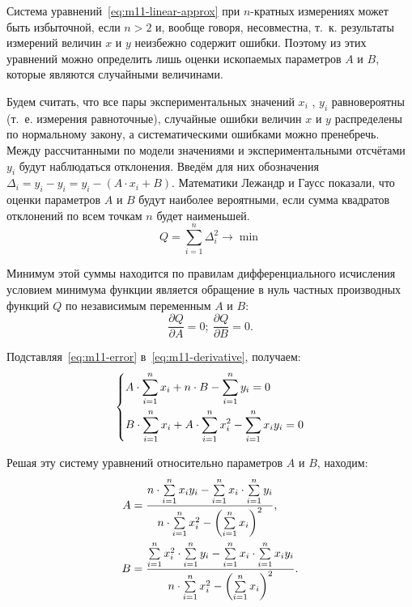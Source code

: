 \documentclass[a4paper, 12pt]{extarticle}
\newcommand{\isum}{\sum\limits_{i=1}^{n}}
\begin{document}
Система уравнений~\eqref{eq:m11-linear-approx} при $n$-кратных измерениях может быть избыточной, если $n >2$ и, вообще говоря, несовместна, т.~к. результаты измерений величин $x$ и $y$ неизбежно содержит ошибки. Поэтому из этих уравнений можно определить лишь оценки ископаемых параметров $A$ и $B$, которые являются случайными величинами. %

Будем считать, что все пары экспериментальных значений $x_i$ , $y_i$  равновероятны (т.~е. измерения равноточные), случайные ошибки величин $x$ и $y$ распределены по нормальному закону, а систематическими ошибками можно пренебречь. Между рассчитанными по модели значениями и экспериментальными отсчётами $y_i$ будут наблюдаться отклонения. Введём для них обозначения $\Delta_i = y_i - y_i = y_i - (A \cdot x_i + B)$. %
Математики Лежандр и Гаусс показали, что оценки параметров $A$ и $B$ будут наиболее вероятными, если сумма квадратов отклонений по всем точкам $n$ будет наименьшей. %
\begin{equation}
\label{eq:m11-error}
Q = \isum \Delta_i^2 \to \min
\end{equation}

Минимум этой суммы находится по правилам дифференциального исчисления условием минимума функции является обращение в нуль частных производных функций $Q$ по независимым переменным $A$ и $B$: 
\begin{equation}
\label{eq:m11-derivative}
\frac{\partial Q}{\partial A} = 0; \ \frac{\partial Q}{\partial B} = 0. %
\end{equation}

Подставляя~\eqref{eq:m11-error} в~\eqref{eq:m11-derivative}, получаем: %
\begin{equation}
\label{eq:m11-system}
\left\{ \aligned
&A \cdot \isum x_i + n \cdot B - \isum y_i = 0 \\ %
&B \cdot \isum x_i + A \cdot \isum x_i^2 - \isum x_i y_i = 0 %
\endaligned \right.
\end{equation}

Решая эту систему уравнений относительно параметров $A$ и $B$, находим: 
\begin{equation}
\label{eq:m11-solution} %
\aligned
A &= \frac{n \cdot \isum x_i y_i - \isum x_i \cdot \isum y_i}{n \cdot \isum x_i^2 - \left( \isum x_i \right)^2}, \\
B &= \frac{\isum x_i^2 \cdot \isum y_i - \isum x_i \cdot \isum x_i y_i}{n \cdot \isum x_i^2 - \left( \isum x_i \right)^2}. %
\endaligned
\end{equation}
\end{document}
